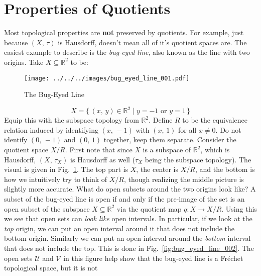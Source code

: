 \documentclass{article}
\theoremstyle{plain}
\theoremstyle{normal}
\begin{document}
    \section{Properties of Quotients}
        Most topological properties are \textbf{not} preserved by quotients.
        For example, just because $(X,\,\tau)$ is Hausdorff, doesn't mean all of
        it's quotient spaces are. The easiest example to describe is the
        \textit{bug-eyed line}, also known as the line with two origins.
        Take $X\subseteq\mathbb{R}^{2}$ to be:
        \begin{figure}
            \centering
            \texttt{[image: ../../../images/bug\_eyed\_line\_001.pdf]}
            \caption{The Bug-Eyed Line}
            \label{fig:bug_eyed_line_001}
        \end{figure}
        \begin{equation}
            X=\{\,(x,\,y)\in\mathbb{R}^{2}\;|\;y=-1\textrm{ or }y=1\,\}
        \end{equation}
        Equip this with the subspace topology from $\mathbb{R}^{2}$.
        Define $R$ to be the equivalence relation induced by identifying
        $(x,\,-1)$ with $(x,\,1)$ for all $x\ne{0}$. Do not identify
        $(0,\,-1)$ and $(0,\,1)$ together, keep them separate. Consider the
        quotient space $X/R$. First note that since $X$ is a subspace of
        $\mathbb{R}^{2}$, which is Hausdorff, $(X,\,\tau_{X})$ is
        Hausdorff as well ($\tau_{X}$ being the subspace topology). The
        visual is given in Fig.~\ref{fig:bug_eyed_line_001}. The top part
        is $X$, the center is $X/R$, and the bottom is how we intuitively try
        to think of $X/R$, though realizing the middle picture is slightly
        more accurate. What do open subsets around the two origins look like?
        A subset of the bug-eyed line is open if and only if the pre-image of
        the set is an open subset of the subspace $X\subseteq\mathbb{R}^{2}$
        via the quotient map $q:X\rightarrow{X}/R$.
        Using this we see that open sets can \textit{look like} open intervals.
        In particular, if we look at the \textit{top} origin, we can put an
        open interval around it that does not include the bottom origin.
        Similarly we can put an open interval around the
        \textit{bottom} interval that does not include the top. This is done
        in Fig.~\ref{fig:bug_eyed_line_002}. The open sets
        $\mathcal{U}$ and $\mathcal{V}$ in this figure help show that
        the bug-eyed line is a Fr\'{e}chet topological space, but it is not
\end{document}
